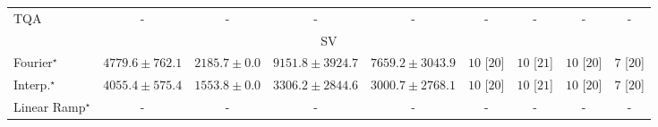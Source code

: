 \begin{tabular}{l|cccc|cccc|}
TQA & {\cellcolor[HTML]{000000}} \color[HTML]{F1F1F1} {\cellcolor{white}} \color{black} - & {\cellcolor[HTML]{000000}} \color[HTML]{F1F1F1} {\cellcolor{white}} \color{black} - & {\cellcolor[HTML]{000000}} \color[HTML]{F1F1F1} {\cellcolor{white}} \color{black} - & {\cellcolor[HTML]{000000}} \color[HTML]{F1F1F1} {\cellcolor{white}} \color{black} - & {\cellcolor[HTML]{000000}} \color[HTML]{F1F1F1} {\cellcolor{white}} \color{black} - & {\cellcolor[HTML]{000000}} \color[HTML]{F1F1F1} {\cellcolor{white}} \color{black} - & {\cellcolor[HTML]{000000}} \color[HTML]{F1F1F1} {\cellcolor{white}} \color{black} - & {\cellcolor[HTML]{000000}} \color[HTML]{F1F1F1} {\cellcolor{white}} \color{black} - \\
\cline{1-9}
\multicolumn{9}{c}{\rule{0pt}{8pt}SV} \\
\midrule
Fourier$^\star$ & {\cellcolor[HTML]{94B6D7}} \color[HTML]{000000} $4779.6\pm 762.1$ & {\cellcolor[HTML]{F2ECF5}} \color[HTML]{000000} $2185.7\pm 0.0$ & {\cellcolor[HTML]{023A5B}} \color[HTML]{F1F1F1} $9151.8\pm 3924.7$ & {\cellcolor[HTML]{0567A2}} \color[HTML]{F1F1F1} $7659.2\pm 3043.9$ & {\cellcolor[HTML]{49006A}} \color[HTML]{F1F1F1} $10$ [$20$] & {\cellcolor[HTML]{49006A}} \color[HTML]{F1F1F1} $10$ [$21$] & {\cellcolor[HTML]{49006A}} \color[HTML]{F1F1F1} $10$ [$20$] & {\cellcolor[HTML]{CD238F}} \color[HTML]{F1F1F1} $7$ [$20$] \\
Interp.$^\star$ & {\cellcolor[HTML]{B7C5DF}} \color[HTML]{000000} $4055.4\pm 575.4$ & {\cellcolor[HTML]{FFF7FB}} \color[HTML]{000000} $1553.8\pm 0.0$ & {\cellcolor[HTML]{D5D5E8}} \color[HTML]{000000} $3306.2\pm 2844.6$ & {\cellcolor[HTML]{DEDCEC}} \color[HTML]{000000} $3000.7\pm 2768.1$ & {\cellcolor[HTML]{49006A}} \color[HTML]{F1F1F1} $10$ [$20$] & {\cellcolor[HTML]{49006A}} \color[HTML]{F1F1F1} $10$ [$21$] & {\cellcolor[HTML]{49006A}} \color[HTML]{F1F1F1} $10$ [$20$] & {\cellcolor[HTML]{CD238F}} \color[HTML]{F1F1F1} $7$ [$20$] \\
Linear Ramp$^\star$ & {\cellcolor[HTML]{000000}} \color[HTML]{F1F1F1} {\cellcolor{white}} \color{black} - & {\cellcolor[HTML]{000000}} \color[HTML]{F1F1F1} {\cellcolor{white}} \color{black} - & {\cellcolor[HTML]{000000}} \color[HTML]{F1F1F1} {\cellcolor{white}} \color{black} - & {\cellcolor[HTML]{000000}} \color[HTML]{F1F1F1} {\cellcolor{white}} \color{black} - & {\cellcolor[HTML]{000000}} \color[HTML]{F1F1F1} {\cellcolor{white}} \color{black} - & {\cellcolor[HTML]{000000}} \color[HTML]{F1F1F1} {\cellcolor{white}} \color{black} - & {\cellcolor[HTML]{000000}} \color[HTML]{F1F1F1} {\cellcolor{white}} \color{black} - & {\cellcolor[HTML]{000000}} \color[HTML]{F1F1F1} {\cellcolor{white}} \color{black} - \\

\end{tabular}
